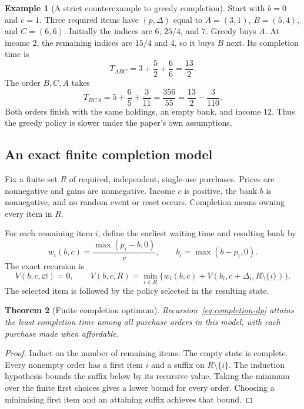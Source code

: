 \documentclass[11pt,a4paper]{article}
\numberwithin{equation}{section}
\newtheorem{theorem}{Theorem}[section]
\theoremstyle{definition}
\newtheorem{example}[theorem]{Example}
\theoremstyle{remark}
\begin{document}
\begin{example}[A strict counterexample to greedy completion]\label{ex:greedy}
Start with $b=0$ and $c=1$. Three required items have $(p,\Delta)$ equal to $A=(3,1)$, $B=(5,4)$, and $C=(6,6)$. Initially the indices are $6$, $25/4$, and $7$. Greedy buys $A$. At income $2$, the remaining indices are $15/4$ and $4$, so it buys $B$ next. Its completion time is
\[
 T_{ABC}=3+\frac52+\frac66=\frac{13}{2}.
\]
The order $B,C,A$ takes
\[
 T_{BCA}=5+\frac65+\frac3{11}=\frac{356}{55}
 =\frac{13}{2}-\frac3{110}.
\]
Both orders finish with the same holdings, an empty bank, and income $12$. Thus the greedy policy is slower under the paper's own assumptions.
\end{example}

\subsection{An exact finite completion model}\label{sec:finite-completion}
Fix a finite set $R$ of required, independent, single-use purchases. Prices are nonnegative and gains are nonnegative. Income $c$ is positive, the bank $b$ is nonnegative, and no random event or reset occurs. Completion means owning every item in $R$.

For each remaining item $i$, define the earliest waiting time and resulting bank by
\[
 w_i(b,c)=\frac{\max(p_i-b,0)}c,\qquad
 b_i=\max(b-p_i,0).
\]
The exact recursion is
\begin{equation}\label{eq:completion-dp}
 V(b,c,\varnothing)=0,\qquad
 V(b,c,R)=\min_{i\in R}\{w_i(b,c)+V(b_i,c+\Delta_i,R\setminus\{i\})\}.
\end{equation}
The selected item is followed by the policy selected in the resulting state.

\begin{theorem}[Finite completion optimum]\label{thm:completion}
Recursion~\eqref{eq:completion-dp} attains the least completion time among all purchase orders in this model, with each purchase made when affordable.
\end{theorem}
\begin{proof}
Induct on the number of remaining items. The empty state is complete. Every nonempty order has a first item $i$ and a suffix on $R\setminus\{i\}$. The induction hypothesis bounds the suffix below by its recursive value. Taking the minimum over the finite first choices gives a lower bound for every order. Choosing a minimising first item and an attaining suffix achieves that bound.
\end{proof}
\end{document}
